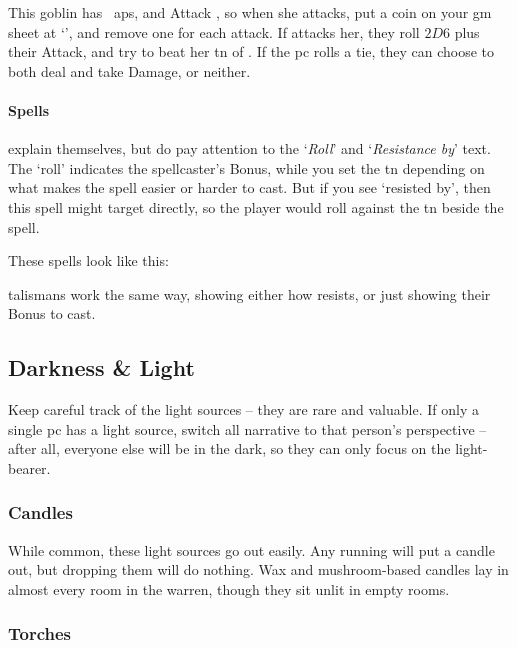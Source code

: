 \begin{multicols}{2}
{  

  This goblin has ~\glspl{ap}, and Attack , so when she attacks, put a coin on your \gls{gm} sheet at `', and remove one for each attack.
  If  attacks her, they roll $2D6$ plus their Attack, and try to beat her \gls{tn} of .
  If the \gls{pc} rolls a tie, they can choose to both deal and take Damage, or neither.

  \paragraph{Spells}
  explain themselves, but do pay attention to the `\textit{Roll}' and `\textit{Resistance by}' text.
  The `roll' indicates the spellcaster's Bonus, while you set the \gls{tn} depending on what makes the spell easier or harder to cast.
  But if you see `resisted by', then this spell might target  directly, so the player would roll against the \gls{tn} beside the spell.

  These spells look like this:

  \begin{exampletext}
    \showStdSpells
  \end{exampletext}

  \Glspl{talisman} work the same way, showing either how  resists, or just showing their Bonus to cast.
}{}

\subsection{Darkness \& Light}

Keep careful track of the light sources -- they are rare and valuable.
If only a single \gls{pc} has a light source, switch all narrative to that person's perspective -- after all, everyone else will be in the dark, so they can only focus on the light-bearer.

\subsubsection{Candles}

While common, these light sources go out easily.
Any running will put a candle out, but dropping them will do nothing.
Wax and mushroom-based candles lay in almost every room in the \gls{warren}, though they sit unlit in empty rooms.

\subsubsection{Torches}


\end{multicols}
